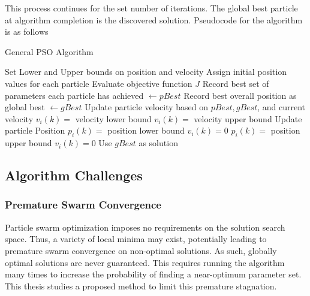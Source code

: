 \noindent This process continues for the set number of iterations. The global best particle at algorithm completion
is the discovered solution. Pseudocode for the algorithm is as follows

\begin{algorithm}[H]
    \caption{General PSO Algorithm}
    \begin{algorithmic}
    
    \STATE Set Lower and Upper bounds on position and velocity
    \STATE Assign initial position values for each particle
    \ENDFOR
    \STATE Evaluate objective function $J$
    \ENDFOR
    \STATE Record best set of parameters each particle has achieved $\leftarrow pBest$
    \STATE Record best overall position as global best $\leftarrow gBest$
    \STATE Update particle velocity based on $pBest, gBest$, and current velocity
    \STATE $v_i(k) = $ velocity lower bound
    \STATE $v_i(k) = $ velocity upper bound
    \ENDIF
    \STATE Update particle Position
    \STATE $p_i(k) = $ position lower bound
    \STATE $v_i(k) = 0$
    \STATE $p_i(k) = $ position upper bound
    \STATE $v_i(k) = 0$
    \ENDIF
    \ENDFOR
    \ENDFOR
    \STATE Use $gBest$ as solution
    \end{algorithmic}
    \label{alg:PSOGeneral}

\end{algorithm}

\subsection{Algorithm Challenges}
\label{section:Challenges}


\subsubsection{Premature Swarm Convergence}

\noindent Particle swarm optimization imposes no requirements on the solution search space.
Thus, a variety of local minima may exist, potentially leading to premature swarm convergence on non-optimal solutions. As such, globally optimal solutions are never guaranteed.
This requires running the algorithm many times to increase the probability of finding a near-optimum parameter set. 
This thesis studies a proposed method to limit this premature stagnation.

